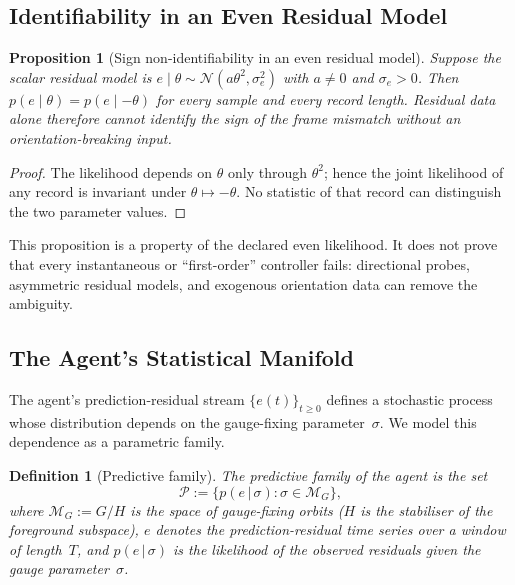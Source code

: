 \documentclass[12pt,a4paper,openany]{book}
\newtheorem{proposition}[theorem]{Proposition}
\newtheorem{definition}[theorem]{Definition}
\begin{document}
\subsection{Identifiability in an Even Residual Model}
\label{T-III-subsec:first_order}

\begin{proposition}[Sign non-identifiability in an even residual model]
\label{T-III-prop:first_order_nonidentifiability}
Suppose the scalar residual model is
$e\mid\theta\sim\mathcal N(a\theta^2,\sigma_e^2)$ with
$a\neq0$ and $\sigma_e>0$.  Then
$p(e\mid\theta)=p(e\mid-\theta)$ for every sample and every
record length.  Residual data alone therefore cannot identify the sign
of the frame mismatch without an orientation-breaking input.
\end{proposition}

\begin{proof}
The likelihood depends on $\theta$ only through $\theta^2$; hence the
joint likelihood of any record is invariant under
$\theta\mapsto-\theta$.  No statistic of that record can distinguish
the two parameter values.
\end{proof}

This proposition is a property of the declared even likelihood.  It
does not prove that every instantaneous or ``first-order'' controller
fails: directional probes, asymmetric residual models, and exogenous
orientation data can remove the ambiguity.

\subsection{The Agent's Statistical Manifold}
\label{T-III-subsec:stat_manifold}

The agent's prediction-residual stream
$\{e(t)\}_{t \geq 0}$ defines a stochastic process whose
distribution depends on the gauge-fixing
parameter~$\sigma$.
We model this dependence as a parametric family.

\begin{definition}[Predictive family]
\label{T-III-def:predictive_family}
The \emph{predictive family} of the agent is the set
\begin{equation}
\label{T-III-eq:predictive_family}
\mathcal{P}
:= \bigl\{p(e\,|\,\sigma)
  : \sigma \in \mathcal{M}_G\bigr\},
\end{equation}
where $\mathcal{M}_G := G/H$ is the space of gauge-fixing
orbits ($H$ is the stabiliser of the foreground subspace),
$e$ denotes the prediction-residual time series over a
window of length~$T$, and $p(e\,|\,\sigma)$ is the
likelihood of the observed residuals given the gauge
parameter~$\sigma$.
\end{definition}
\end{document}
